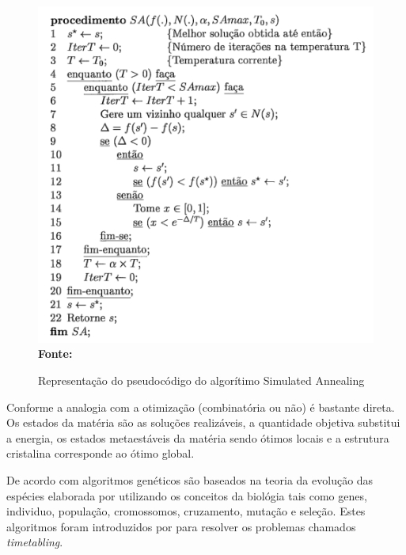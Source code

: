 \begin{figure}[!htb]
\caption[Representação do pseudocódigo do algorítimo Simulated Annealing]{Representação do pseudocódigo do algorítimo Simulated Annealing}
\label{fig:figura2}
\centering
\includegraphics[scale=0.55]{imagens/representacaoSimulatedAnnealing.png}
\\ \textbf{\footnotesize Fonte: \cite{souza2002experiencias}}
\end{figure}

Conforme \cite{aarts1988simulated} a analogia com a otimização (combinatória ou não) é bastante direta. Os estados da matéria são as soluções realizáveis, a quantidade objetiva substitui a energia, os estados metaestáveis da matéria sendo ótimos locais e a estrutura cristalina corresponde ao ótimo global.\par 





De acordo com \cite{goldberg1989genetic} algoritmos genéticos são baseados na teoria da evolução das espécies elaborada por \cite{darwin1968origin} utilizando os conceitos da biológia tais como genes, individuo, população, cromossomos, cruzamento, mutação e seleção. Estes algoritmos foram introduzidos por \cite{holland1975adaptation} para resolver os problemas chamados \textit{timetabling}.

